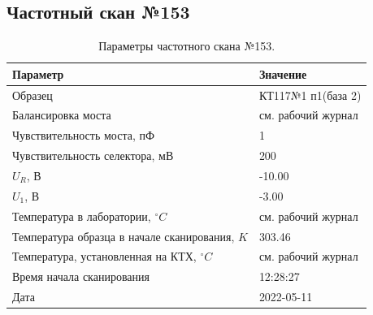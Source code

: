 \subsection{Частотный скан №153}
\begin{table}[!ht]
    \centering
    \caption{Параметры частотного скана №153.}
    \begin{tabular}{|l|l|}
        \hline
        Параметр                                       & Значение                  \\ \hline
        Образец                                        & КТ117№1 п1(база 2)        \\ \hline
        Балансировка моста                             & см. рабочий журнал        \\ \hline
        Чувствительность моста, пФ                     & 1                         \\ \hline
        Чувствительность селектора, мВ                 & 200                       \\ \hline
        $U_R$, В                                       & -10.00                    \\ \hline
        $U_1$, В                                       & -3.00                     \\ \hline
        Температура в лаборатории, $^\circ C$          & см. рабочий журнал        \\ \hline
        Температура образца в начале сканирования, $K$ & 303.46                    \\ \hline
        Температура, установленная на КТХ, $^\circ C$  & см. рабочий журнал        \\ \hline
        Время начала сканирования                      & 12:28:27                  \\ \hline
        Дата                                           & 2022-05-11                \\ \hline
    \end{tabular}
    \label{table:frequency_scan_153}
\end{table}

